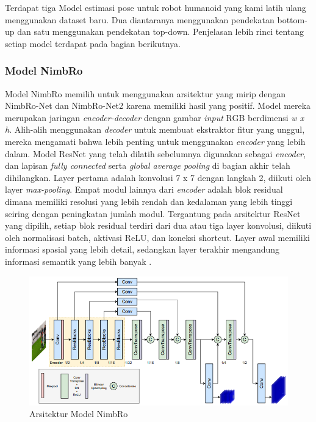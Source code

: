 Terdapat tiga Model estimasi pose untuk robot humanoid yang kami latih ulang menggunakan dataset baru. Dua diantaranya menggunakan pendekatan bottom-up dan satu menggunakan pendekatan top-down. Penjelasan lebih rinci tentang setiap model terdapat pada bagian berikutnya.

\subsubsection{Model NimbRo}
\label{subsubsec:nimbromodel}

Model NimbRo memilih untuk menggunakan arsitektur yang mirip dengan NimbRo-Net dan NimbRo-Net2 karena memiliki hasil yang positif.
Model mereka merupakan jaringan \emph{encoder-decoder} dengan gambar \emph{input} RGB berdimensi \emph{w x h}. Alih-alih menggunakan \emph{decoder} untuk membuat ekstraktor fitur yang unggul, mereka mengamati bahwa lebih penting untuk menggunakan \emph{encoder} yang lebih dalam.
Model ResNet yang telah dilatih sebelumnya \parencite{he2016} digunakan sebagai \emph{encoder}, dan lapisan \emph{fully connected} serta \emph{global average pooling} di bagian akhir telah dihilangkan.
Layer pertama adalah konvolusi 7 x 7 dengan langkah 2, diikuti oleh layer \emph{max-pooling}. Empat modul lainnya dari \emph{encoder} adalah blok residual dimana memiliki resolusi yang lebih rendah dan kedalaman yang lebih tinggi seiring dengan peningkatan jumlah modul.
Tergantung pada arsitektur ResNet yang dipilih, setiap blok residual terdiri dari dua atau tiga layer konvolusi, diikuti oleh normalisasi batch, aktivasi ReLU, dan koneksi shortcut. Layer awal memiliki informasi spasial yang lebih detail,
sedangkan layer terakhir mengandung informasi semantik yang lebih banyak \parencite{amini2021}.

\begin{figure}[ht]
  \centering
  \includegraphics[scale=0.9]{gambar/nimbro-architecture.png}
  \caption{Arsitektur Model NimbRo}
  \label{fig:nimbro-model-architecture}
\end{figure}

